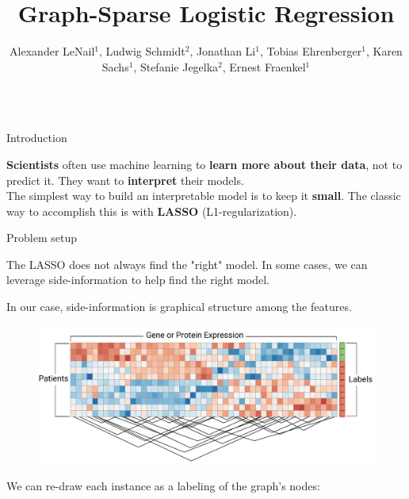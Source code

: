 \documentclass[svgnames,final]{beamer}
\title{Graph-Sparse Logistic Regression}
\author{Alexander LeNail$^1$, Ludwig Schmidt$^2$, Jonathan Li$^1$, Tobias Ehrenberger$^1$, Karen Sachs$^1$, Stefanie Jegelka$^2$, Ernest Fraenkel$^1$}
\institute{$^1$MIT BE, $^2$MIT CSAIL}
\begin{document}
\begin{frame}
\vspace{-.5cm}
\begin{columns}[T]

\begin{column}{.3\linewidth}

	\begin{block}{Introduction}

		\textbf{Scientists} often use machine learning to \textbf{learn more about their data}, not to predict it. They want to \textbf{interpret} their models. \\

		The simplest way to build an interpretable model is to keep it \textbf{small}. The classic way to accomplish this is with \textbf{LASSO} (L1-regularization).

	\end{block}

	\vspace{2cm}

	\begin{block}{Problem setup}

		The LASSO does not always find the "right" model. In some cases, we can leverage side-information to help find the right model.

		\vspace{.5cm}

		In our case, side-information is graphical structure among the features.

		\begin{figure}[h]
		\centering
		\includegraphics[width=\linewidth]{images/matrix.pdf}
		\end{figure}

		We can re-draw each instance as a labeling of the graph's nodes:


\end{block}
\end{column}
\end{columns}
\end{frame}
\end{document}
